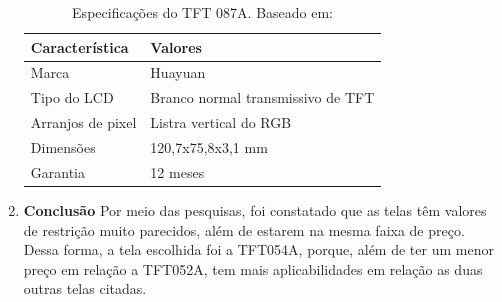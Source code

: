 \begin{enumerate}
\begin{table}[ht]
\caption{Especificações do TFT 087A. Baseado em: \cite{monitor_lcd}}
\centering
\begin{tabular}{| l |  p{10cm} |}
\hline
Característica & Valores \\
\hline
Marca & Huayuan \\
\hline
Tipo do LCD & Branco normal transmissivo de TFT \\
\hline
Arranjos de pixel & Listra vertical do RGB \\
\hline
Dimensões & 120,7x75,8x3,1 mm \\
\hline
Garantia & 12 meses \\
\hline
\end{tabular}
\label{table:table_tft87a}
\end{table}

\item \textbf{Conclusão}
Por meio das pesquisas, foi constatado que as telas têm valores de restrição
 muito parecidos, além de estarem na mesma faixa de preço. Dessa forma, a
  tela escolhida foi a TFT054A, porque, além de ter um menor preço em relação a
  TFT052A, tem mais aplicabilidades em relação as duas outras telas citadas.
\end{enumerate}
